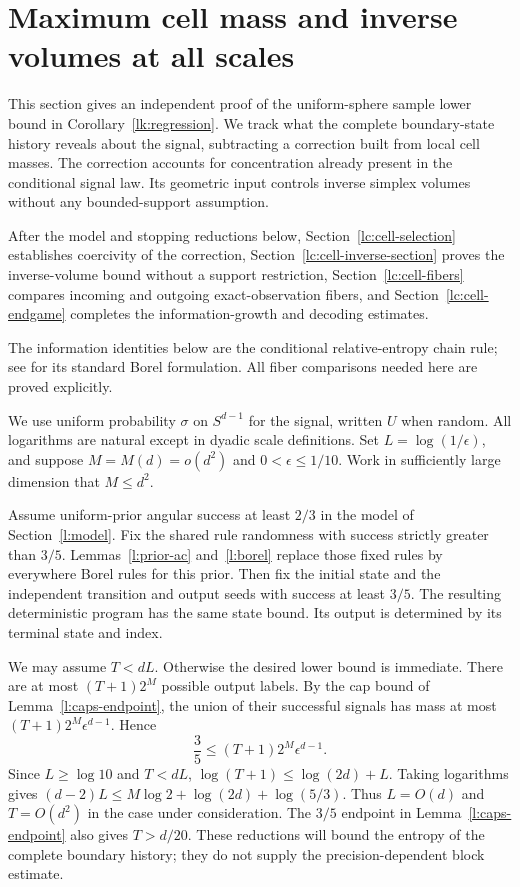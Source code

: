 \section{Maximum cell mass and inverse volumes at all scales}\label{lc:cell}

This section gives an independent proof of the uniform-sphere sample
lower bound in Corollary~\ref{lk:regression}. We track what the complete
boundary-state history reveals about the signal, subtracting a
correction built from local cell masses. The correction accounts for
concentration already present in the conditional signal law. Its
geometric input controls inverse simplex volumes without any
bounded-support assumption.

After the model and stopping reductions below,
Section~\ref{lc:cell-selection} establishes coercivity of the correction,
Section~\ref{lc:cell-inverse-section} proves the inverse-volume bound
without a support restriction, Section~\ref{lc:cell-fibers} compares
incoming and outgoing exact-observation fibers, and
Section~\ref{lc:cell-endgame} completes the information-growth and
decoding estimates.

The information identities below are the conditional relative-entropy chain rule; see \cite[Section~3.3]{Austin2020} for its standard Borel formulation. All fiber comparisons needed here are proved explicitly.

We use uniform probability \(\sigma\) on \(S^{d-1}\) for the signal,
written \(U\) when random. All logarithms are natural except in dyadic
scale definitions. Set \(L=\log(1/\epsilon)\), and suppose
\(M=M(d)=o(d^2)\) and \(0<\epsilon\le1/10\). Work in sufficiently
large dimension that \(M\le d^2\).

Assume uniform-prior angular success at least \(2/3\) in the model of
Section~\ref{l:model}. Fix the shared rule randomness with success
strictly greater than \(3/5\). Lemmas~\ref{l:prior-ac} and~\ref{l:borel}
replace those fixed rules by everywhere Borel rules for this prior.
Then fix the initial state and the independent transition and output
seeds with success at least \(3/5\). The resulting deterministic
program has the same state bound. Its output is determined by its
terminal state and index.

We may assume \(T<dL\). Otherwise the desired lower bound is immediate.
There are at most \((T+1)2^M\) possible output labels. By the cap bound
of Lemma~\ref{l:caps-endpoint}, the union of their successful signals
has mass at most \((T+1)2^M\epsilon^{d-1}\). Hence
\[
 \frac35\le (T+1)2^M\epsilon^{d-1}.
\]
Since \(L\ge\log10\) and \(T<dL\),
\(\log(T+1)\le\log(2d)+L\). Taking logarithms gives
\((d-2)L\le M\log2+\log(2d)+\log(5/3)\). Thus \(L=O(d)\) and
\(T=O(d^2)\) in the case under consideration. The \(3/5\) endpoint
in Lemma~\ref{l:caps-endpoint} also gives \(T>d/20\). These reductions
will bound the entropy of the complete boundary history; they do not
supply the precision-dependent block estimate.

